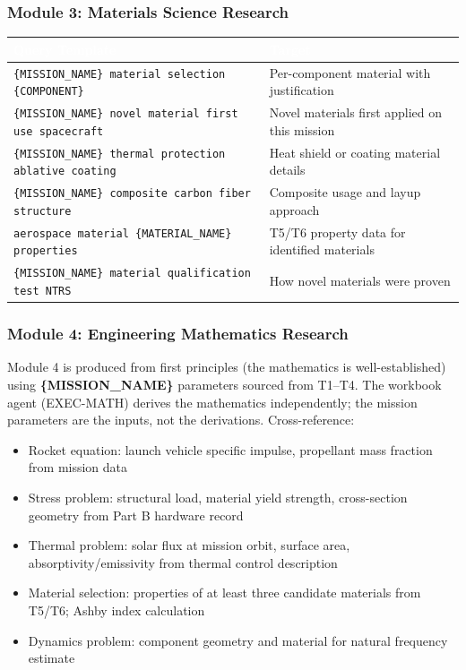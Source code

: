\documentclass[11pt,letterpaper]{article}
\newcommand{\param}[1]{\textcolor{paramred}{\textbf{\{#1\}}}}
\newcommand{\tableheader}[1]{\textbf{\sffamily\textcolor{white}{#1}}}
\begin{document}
\subsubsection{Module 3: Materials Science Research}

\begin{center}
\begin{tabularx}{\textwidth}{L{4cm}X}
\toprule
{}
\tableheader{Query Template} & \tableheader{Target} \\
\midrule
\texttt{\{MISSION\_NAME\} material selection \{COMPONENT\}} & Per-component material with justification \\
\texttt{\{MISSION\_NAME\} novel material first use spacecraft} & Novel materials first applied on this mission \\
\texttt{\{MISSION\_NAME\} thermal protection ablative coating} & Heat shield or coating material details \\
\texttt{\{MISSION\_NAME\} composite carbon fiber structure} & Composite usage and layup approach \\
\texttt{aerospace material \{MATERIAL\_NAME\} properties} & T5/T6 property data for identified materials \\
\texttt{\{MISSION\_NAME\} material qualification test NTRS} & How novel materials were proven \\
\bottomrule
\end{tabularx}
\end{center}

\subsubsection{Module 4: Engineering Mathematics Research}

Module 4 is produced from first principles (the mathematics is well-established) using \param{MISSION\_NAME} parameters sourced from T1--T4. The workbook agent (EXEC-MATH) derives the mathematics independently; the mission parameters are the inputs, not the derivations. Cross-reference:

\begin{itemize}[leftmargin=*]
  \item Rocket equation: launch vehicle specific impulse, propellant mass fraction from mission data
  \item Stress problem: structural load, material yield strength, cross-section geometry from Part B hardware record
  \item Thermal problem: solar flux at mission orbit, surface area, absorptivity/emissivity from thermal control description
  \item Material selection: properties of at least three candidate materials from T5/T6; Ashby index calculation
  \item Dynamics problem: component geometry and material for natural frequency estimate
\end{itemize}
\end{document}
